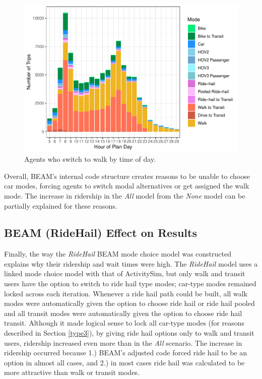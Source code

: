 \documentclass[fancy, masters]{byuthesis}
\begin{document}
\begin{figure}

{\centering \includegraphics{thesis_files/figure-latex/walkers-1} 

}

\caption{Agents who switch to walk by time of day.}\label{fig:walkers}
\end{figure}

Overall, BEAM's internal code structure creates reasons to be unable to choose car modes, forcing agents to switch modal alternatives or get assigned the walk mode. The increase in ridership in the \emph{All} model from the \emph{None} model can be partially explained for these reasons.

\hypertarget{type2}{%
\subsection{BEAM (RideHail) Effect on Results}\label{type2}}

Finally, the way the \emph{RideHail} BEAM mode choice model was constructed explains why their ridership and wait times were high. The \emph{RideHail} model uses a linked mode choice model with that of ActivitySim, but only walk and transit users have the option to switch to ride hail type modes; car-type modes remained locked across each iteration. Whenever a ride hail path could be built, all walk modes were automatically given the option to choose ride hail or ride hail pooled and all transit modes were automatically given the option to choose ride hail transit. Although it made logical sense to lock all car-type modes (for reasons described in Section \ref{type3}), by giving ride hail options only to walk and transit users, ridership increased even more than in the \emph{All} scenario. The increase in ridership occurred because 1.) BEAM's adjusted code forced ride hail to be an option in almost all cases, and 2.) in most cases ride hail was calculated to be more attractive than walk or transit modes.
\end{document}
